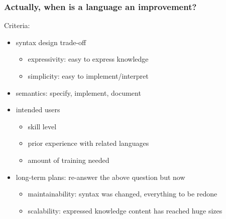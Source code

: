 \documentclass{beamer}
\begin{document}
\begin{frame}\frametitle{Actually, when is a language an improvement?}
Criteria:
\begin{itemize}
\item syntax design trade-off
 \begin{itemize}
  \item expressivity: easy to express knowledge
  \item simplicity: easy to implement/interpret
 \end{itemize}
\item semantics: specify, implement, document
\item intended users
 \begin{itemize}
  \item skill level
  \item prior experience with related languages
  \item amount of training needed
 \end{itemize}
\item long-term plans: re-answer the above question but now
 \begin{itemize}
  \item maintainability: syntax was changed, everything to be redone
  \item scalability: expressed knowledge content has reached huge sizes
 \end{itemize}
\end{itemize}
\end{frame}
\end{document}
